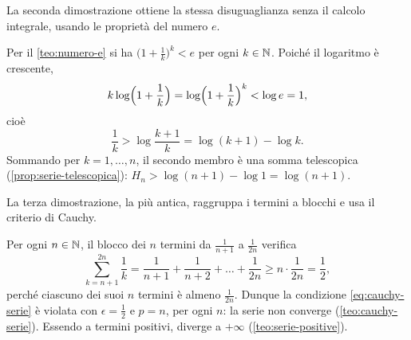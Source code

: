 La seconda dimostrazione ottiene la stessa disuguaglianza senza il calcolo integrale,
usando le proprietà del numero $e$.

\begin{dimostrazione}
Per il \cref{teo:numero-e} si ha $\bigl(1+\frac1k\bigr)^{k}<e$ per ogni $k\in\mathbb{N}$. Poiché il
logaritmo è crescente,
\[
  k\log\Bigl(1+\frac1k\Bigr)=\log\Bigl(1+\frac1k\Bigr)^{k}<\log e=1 ,
\]
cioè
\[
  \frac1k>\log\frac{k+1}k=\log(k+1)-\log k .
\]
Sommando per $k=1,\dots,n$, il secondo membro è una somma telescopica
(\cref{prop:serie-telescopica}):
$H_{n}>\log(n+1)-\log1=\log(n+1)$.
\end{dimostrazione}

La terza dimostrazione, la più antica, raggruppa i termini a blocchi e usa il criterio di
Cauchy.

\begin{dimostrazione}
Per ogni $n\in\mathbb{N}$, il blocco dei $n$ termini da $\frac1{n+1}$ a $\frac1{2n}$ verifica
\[
  \sum_{k=n+1}^{2n}\frac1k=\frac1{n+1}+\frac1{n+2}+\dots+\frac1{2n}\ge n\cdot\frac1{2n}=\frac12 ,
\]
perché ciascuno dei suoi $n$ termini è almeno $\frac1{2n}$. Dunque la condizione
\eqref{eq:cauchy-serie} è violata con $\epsilon=\frac12$ e $p=n$, per ogni $n$: la serie non
converge (\cref{teo:cauchy-serie}). Essendo a termini positivi, diverge a $+\infty$
(\cref{teo:serie-positive}).
\end{dimostrazione}

